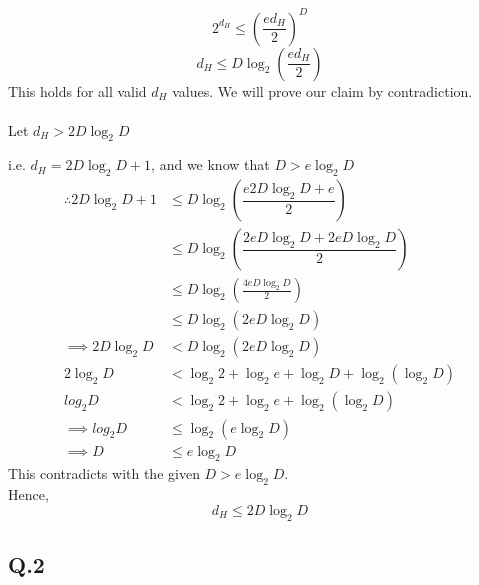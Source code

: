 \documentclass[17pt]{article}
\begin{document}
$$2^{d_{H}} \leq \left( \dfrac{e d_{H}}{2}\right)^{D}$$
$$d_{H} \leq D \log_2\left( \dfrac{e d_{H}}{2} \right)$$
This holds for all valid $d_{H}$ values. We will prove our claim by contradiction.\\\\
Let $d_{H} > 2D \log_2 D$

i.e. $d_{H}=2D \log_2 D +1$, and we know that  $D > e \log_{2} D$\\
\begin{equation*}
\begin{aligned}
\therefore 2D \log_2 D + 1 
& \leq D \log_2 \left( \dfrac{e 2 D\log_2 D + e}{2} \right)\\
& \leq D \log_2 \left( \dfrac{2 e D \log_2 D + 2 e D \log_2 D}{2}\right) \\
& \leq D \log_2 \left( \frac{4 e D \log_2 D }{2}\right) \\
& \leq D \log_2 \left( 2 e D \log_2 D\right)\\
\implies 2 D \log_2 D &< D \log_2 \left( 2 e D \log_2 D\right)\\
2 \log_2 D &< \log_2 2 + \log_2 e + \log_2 D + \log_2 (\log_2 D)\\
log_2 D &< \log_2 2 + \log_2 e + \log_2 (\log_2 D)\\
\implies log_2 D &\leq \log_2(e \log_2 D)\\
\implies D &\leq e \log_2 D
\end{aligned}
\end{equation*}
This contradicts with the given $D > e\log_{2}D$.\\

Hence,
$$d_{H} \leq 2D\log_{2}D$$


\newpage

\subsection*{Q.2}
\end{document}
